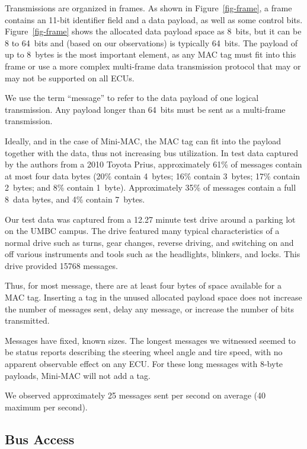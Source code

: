 Transmissions are organized in frames.  As shown in Figure~\ref{fig-frame}, 
a frame contains an 11-bit identifier field and 
a data payload, as well as some control bits. Figure~\ref{fig-frame} 
shows the allocated data payload space as 8~bits, but
it can be 8 to 64~bits and (based on our observations) is typically 64~bits.
The payload of up to 8~bytes is the most important element, 
as any MAC tag must fit into this frame or use a more complex multi-frame data transmission protocol 
that may or may not be supported on all ECUs. 

We use the term ``message'' to refer to the data payload of one logical transmission.
Any payload longer than 64~bits must be sent as a multi-frame transmission.

Ideally, and in the case of Mini-MAC, the MAC tag
can fit into the payload together with the data, thus not increasing bus utilization. 
In test data captured by the authors from a 2010 Toyota Prius, 
approximately 61\% of messages contain at most four data bytes
(20\% contain 4~bytes; 16\% contain 3~bytes; 17\% contain 2~bytes; and 8\% contain 1~byte).
Approximately 35\% of messages contain a full 8~data bytes, and 4\% contain 7~bytes.

Our test data was captured from a 12.27 minute test drive around a parking lot on the UMBC campus. The drive featured many typical characteristics of a normal drive such as turns, gear changes, reverse driving, and switching on and off various instruments and tools such as the headlights, blinkers, and locks. This drive provided 15768 messages.

Thus, for most message, there are at least four bytes of space available for a MAC tag.
Inserting a tag in the unused allocated payload space does not
increase the number of messages sent,
delay any message, 
or increase the number of bits transmitted.

Messages have fixed, known sizes.  The longest messages we witnessed
seemed to be status reports describing the steering wheel angle and tire speed,
with no apparent observable effect on any ECU.
For these long messages with 8-byte payloads,  Mini-MAC will not add a tag. 

We observed approximately 25 messages sent per second on average (40 maximum per second).

\subsection{Bus Access}
\label{access}

